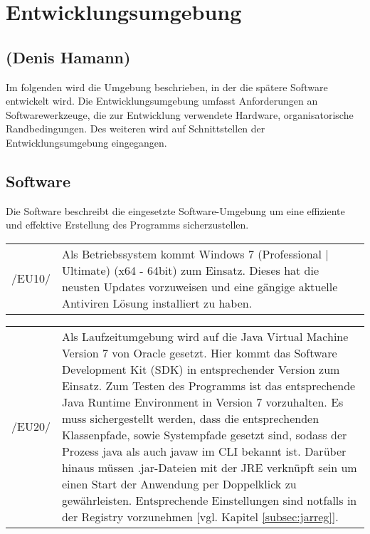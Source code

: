 \section{Entwicklungsumgebung}
\label{sec:Entwicklungsumgebung}

\subsection*{(Denis Hamann)}

Im folgenden wird die Umgebung beschrieben, in der die spätere Software entwickelt wird.
Die Entwicklungsumgebung umfasst Anforderungen an Softwarewerkzeuge, die zur Entwicklung verwendete Hardware, organisatorische
Randbedingungen. Des weiteren wird auf Schnittstellen der Entwicklungsumgebung eingegangen.

\subsection{Software}
\label{subsec:devsoftware}

Die Software beschreibt die eingesetzte Software-Umgebung um eine effiziente und effektive Erstellung des Programms sicherzustellen.\\

\begin{tabular}{p{1.5cm}p{14.5cm}}

	 /EU10/	&  Als Betriebssystem kommt Windows 7 (Professional | Ultimate) (x64 - 64bit) zum Einsatz. Dieses hat die neusten Updates vorzuweisen und eine gängige aktuelle Antiviren Lösung installiert zu haben.\\[0.25cm]

\end{tabular}

\begin{tabular}{p{1.5cm}p{14.5cm}}

	 /EU20/	&  Als Laufzeitumgebung wird auf die Java Virtual Machine Version 7 von Oracle gesetzt. Hier kommt das Software Development Kit (SDK) in entsprechender Version zum Einsatz.
Zum Testen des Programms ist das entsprechende Java Runtime Environment in Version 7 vorzuhalten. Es muss sichergestellt werden, dass die entsprechenden Klassenpfade, sowie Systempfade gesetzt sind, sodass der Prozess java als auch javaw im CLI bekannt ist. Darüber hinaus müssen .jar-Dateien mit der JRE verknüpft sein um einen Start der Anwendung per Doppelklick zu gewährleisten. Entsprechende Einstellungen sind notfalls in der Registry vorzunehmen [vgl. Kapitel \ref{subsec:jarreg}].\\[0.25cm]

\end{tabular}


